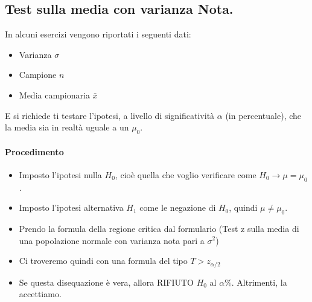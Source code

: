 \subsection{Test sulla media con varianza Nota.}
In alcuni esercizi vengono riportati i seguenti dati:
\begin{itemize}
    \item Varianza $\sigma$
    \item Campione $n$
    \item Media campionaria $\bar{x}$
\end{itemize}
E si richiede ti testare l'ipotesi, a livello di significatività $\alpha$ (in percentuale), che la media sia in realtà uguale a un $\mu_0$.
\paragraph{Procedimento}
\begin{itemize}
    \item Imposto l'ipotesi nulla $H_0$, cioè quella che voglio verificare come $H_0 \to \mu = \mu_0$.
    \item Imposto l'ipotesi alternativa $H_1$ come le negazione di $H_0$, quindi $\mu \neq \mu_0$.
    \item Prendo la formula della regione critica dal formulario (Test z sulla media di una popolazione normale con varianza nota pari a $\sigma^2$)
    \item Ci troveremo quindi con una formula del tipo $T>z_{\alpha/2}$
    \item Se questa disequazione è vera, allora RIFIUTO $H_0$ al $\alpha \%$. Altrimenti, la accettiamo.
\end{itemize}